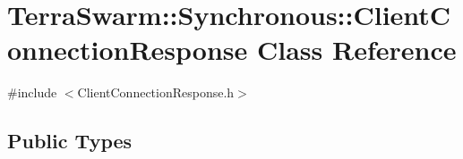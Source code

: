 \hypertarget{class_terra_swarm_1_1_synchronous_1_1_client_connection_response}{\section{Terra\-Swarm\-:\-:Synchronous\-:\-:Client\-Connection\-Response Class Reference}
\label{class_terra_swarm_1_1_synchronous_1_1_client_connection_response}
}


{\ttfamily \#include $<$Client\-Connection\-Response.\-h$>$}

\subsection*{Public Types}
